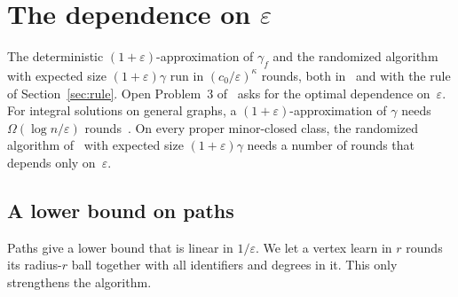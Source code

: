 \documentclass[11pt]{article}
\theoremstyle{remark}
\begin{document}
\section{The dependence on \texorpdfstring{$\varepsilon$}{epsilon}}\label{sec:lower}

The deterministic $(1+\varepsilon)$-approximation of $\gamma_f$ and the randomized algorithm with
expected size $(1+\varepsilon)\gamma$ run in $(c_0/\varepsilon)^{\kappa}$ rounds, both
in~\cite{AS26} and with the rule of Section~\ref{sec:rule}. Open Problem~3 of~\cite{AS26} asks for the optimal
dependence on~$\varepsilon$. For integral solutions on general graphs, a
$(1+\varepsilon)$-approximation of $\gamma$ needs $\Omega(\log n/\varepsilon)$ rounds~\cite{CL23}.
On every proper minor-closed class, the randomized algorithm of~\cite{AS26} with expected size
$(1+\varepsilon)\gamma$ needs a number of rounds that depends only on~$\varepsilon$.

\subsection{A lower bound on paths}\label{sec:paths}

Paths give a lower bound that is linear in $1/\varepsilon$. We let a vertex learn in $r$ rounds
its radius-$r$ ball together with all identifiers and degrees in it. This only strengthens the
algorithm.
\end{document}
